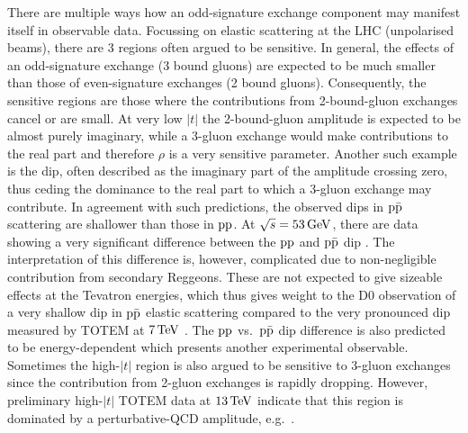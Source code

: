 There are multiple ways how an odd-signature exchange component may manifest itself in observable data. Focussing on elastic scattering at the LHC (unpolarised beams), there are 3 regions often argued to be sensitive. In general, the effects of an odd-signature exchange (3 bound gluons) are expected to be much smaller than those of even-signature exchanges (2 bound gluons). Consequently, the sensitive regions are those where the contributions from 2-bound-gluon exchanges cancel or are small. At very low $|t|$ the 2-bound-gluon amplitude is expected to be almost purely imaginary, while a 3-gluon exchange would make contributions to the real part and therefore $\rho$ is a very sensitive parameter. Another such example is the dip, often described as the imaginary part of the amplitude crossing zero, thus ceding the dominance to the real part to which a 3-gluon exchange may contribute. In agreement with such predictions, the observed dips in $\rm p\bar p$ scattering are shallower than those in $\rm pp$. At $\sqrt s = 53\,{\rm GeV}$, there are data showing a very significant difference between the $\rm pp$ and $\rm p\bar p$ dip \cite{breakstone-85}. The interpretation of this difference is, however, complicated due to non-negligible contribution from secondary Reggeons. These are not expected to give sizeable effects at the Tevatron energies, which thus gives weight to the D0 observation of a very shallow dip in $\rm p\bar p$ elastic scattering \cite{d0-elastic} compared to the very pronounced dip measured by TOTEM at $7\,{\rm TeV}$ \cite{totem-7tev-first}. The $\rm pp$ vs.~$\rm p\bar p$ dip difference is also predicted to be energy-dependent which presents another experimental observable. Sometimes the high-$|t|$ region is also argued to be sensitive to 3-gluon exchanges since the contribution from 2-gluon exchanges is rapidly dropping. However, preliminary high-$|t|$ TOTEM data at $13\,{\rm TeV}$ indicate that this region is dominated by a perturbative-QCD amplitude, e.g.~\cite{Donnachie:1979yu}.

